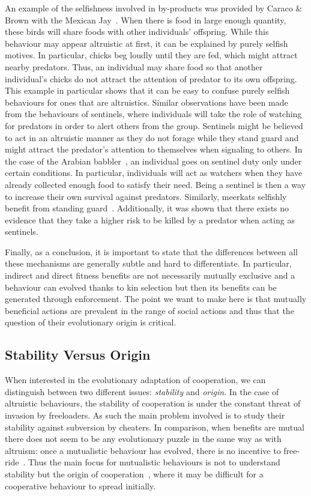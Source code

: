     An example of the selfishness involved in by-products was provided by Caraco \& Brown with the Mexican Jay~\parencite{Caraco1986, Dugatkin2002}. When there is food in large enough quantity, these birds will share foods with other individuals' offspring. While this behaviour may appear altruistic at first, it can be explained by purely selfish motives. In particular, chicks beg loudly until they are fed, which might attract nearby predators. Thus, an individual may share food so that another individual's chicks do not attract the attention of predator to its own offspring. This example in particular shows that it can be easy to confuse purely selfish behaviours for ones that are altruistics. Similar observations have been made from the behaviours of sentinels, where individuals will take the role of watching for predators in order to alert others from the group. Sentinels might be believed to act in an altruistic manner as they do not forage while they stand guard and might attract the predator's attention to themselves when signaling to others. In the case of the Arabian babbler~\parencite{Wright2001}, an individual goes on sentinel duty only under certain conditions. In particular, individuals will act as watchers when they have already collected enough food to satisfy their need. Being a sentinel is then a way to increase their own survival against predators. Similarly, meerkats selfishly benefit from standing guard~\parencite{CluttonBrock1999}. Additionally, it was shown that there exists no evidence that they take a higher risk to be killed by a predator when acting as sentinels.

    Finally, as a conclusion, it is important to state that the differences between all these mechanisms are generally subtle and hard to differentiate. In particular, indirect and direct fitness benefits are not necessarily mutually exclusive and a behaviour can evolved thanks to kin selection but then its benefits can be generated through 
    enforcement. The point we want to make here is that mutually beneficial actions are prevalent in the range of social actions and thus that the question of their evolutionary origin is critical.
    

  \subsection{Stability Versus Origin}

    When interested in the evolutionary adaptation of cooperation, we can distinguish between two different issues: \emph{stability} and \emph{origin}. In the case of altruistic behaviours, the stability of cooperation is under the constant threat of invasion by freeloaders. As such the main problem involved is to study their stability against subversion by cheaters. In comparison, when benefits are mutual there does not seem to be any evolutionary puzzle in the same way as with altruism: once a mutualistic behaviour has evolved, there is no incentive to free-ride~\parencite{Forber2015}. Thus the main focus for mutualistic behaviours is not to understand stability but the origin of cooperation~\parencite{West2007}, where it may be difficult for a cooperative behaviour to spread initially. 


